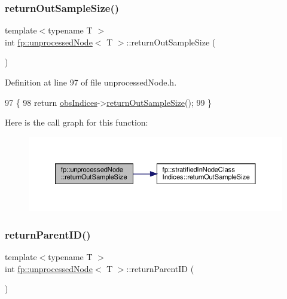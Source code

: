 \subsubsection{\texorpdfstring{return\+Out\+Sample\+Size()}{returnOutSampleSize()}\hspace{0.1cm}{\footnotesize\ttfamily [2/2]}}
{\footnotesize\ttfamily template$<$typename T $>$ \\
int \hyperlink{classfp_1_1unprocessedNode}{fp\+::unprocessed\+Node}$<$ T $>$\+::return\+Out\+Sample\+Size (\begin{DoxyParamCaption}{ }\end{DoxyParamCaption})\hspace{0.3cm}{\ttfamily [inline]}}



Definition at line 97 of file unprocessed\+Node.\+h.


\begin{DoxyCode}
97                                                 \{
98                     \textcolor{keywordflow}{return} \hyperlink{classfp_1_1unprocessedNode_aba9f03124658f62906fa8ded53cef535}{obsIndices}->\hyperlink{classfp_1_1stratifiedInNodeClassIndices_a6630b77af340d2023d88bafa87b94cae}{returnOutSampleSize}();
99                 \}
\end{DoxyCode}
Here is the call graph for this function\+:
\nopagebreak
\begin{figure}[H]
\begin{center}
\leavevmode
\includegraphics[width=350pt]{classfp_1_1unprocessedNode_a0ebfd763233eeb60b9ee6a803e2dc917_cgraph}
\end{center}
\end{figure}
\mbox{\label{classfp_1_1unprocessedNode_aba68d6444ff034f7c43acaf3eeda9520}} 
\subsubsection{\texorpdfstring{return\+Parent\+I\+D()}{returnParentID()}\hspace{0.1cm}{\footnotesize\ttfamily [1/2]}}
{\footnotesize\ttfamily template$<$typename T $>$ \\
int \hyperlink{classfp_1_1unprocessedNode}{fp\+::unprocessed\+Node}$<$ T $>$\+::return\+Parent\+ID (\begin{DoxyParamCaption}{ }\end{DoxyParamCaption})\hspace{0.3cm}{\ttfamily [inline]}}



